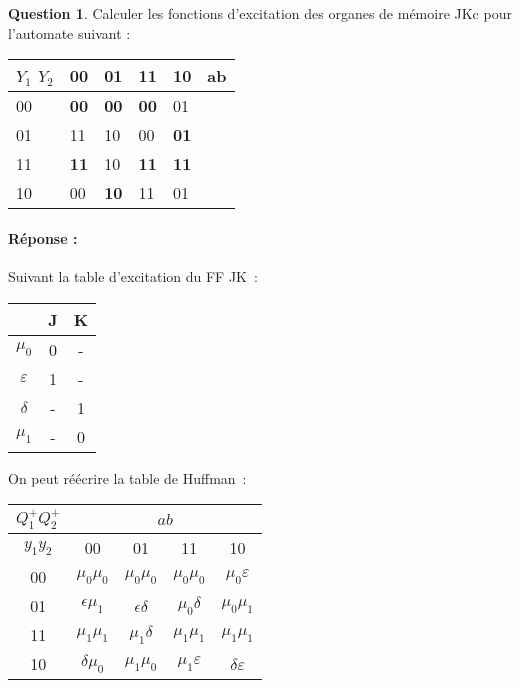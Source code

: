 \documentclass[11pt,a4paper]{article}
\theoremstyle{definition}%
\newtheorem{Q}{Question}[] %
\newcommand{\reponse}[1]{%
	\ifthenelse {\boolean{corrige}} {\paragraph{Réponse :} \color{darkblue}   #1\color{black}} {}
 }
\begin{document}
\begin{Q}
Calculer les fonctions d'excitation des organes de mémoire JKc pour l'automate suivant :


\begin{center}
	\begin{tabular}{|l|l|l|l|l|l}
	\hline
	$Y_1$ $Y_2$ & 00         & 01         & 11         & 10         & \multicolumn{1}{l|}{ab} \\ \hline
	00           & \textbf{00} & \textbf{00} & \textbf{00} & 01          &                         \\ \cline{1-5}
	01           & 11          & 10          & 00          & \textbf{01} &                         \\ \cline{1-5}
	11           & \textbf{11} & 10          & \textbf{11} & \textbf{11} &                         \\ \cline{1-5}
	10           & 00          & \textbf{10} & 11          & 01          &                         \\ \cline{1-5}
	\end{tabular}
\end{center}


\reponse{
	Suivant la table d'excitation du FF JK~:
	\begin{center}
		\begin{tabular}{c|cc}
			& J & K \\ \hline
			$\mu_0$ & 0 & - \\
			$\varepsilon$ & 1 & - \\
			$\delta$ & - & 1 \\
			$\mu_1$ & - & 0
		\end{tabular}
	\end{center}

	On peut réécrire la table de Huffman~:
	\begin{center}
		\begin{tabular}{|c|c|c|c|c|}\hline
		$Q^+_1 Q^+_2$ & \multicolumn{4}{c|}{$ab$} \\ \hline
		$y_1y_2$ & 00 & 01 & 11 & 10 \\ \hline
		00 & $\mu_0\mu_0$ & $\mu_0\mu_0$ & $\mu_0\mu_0$ & $\mu_0\varepsilon$ \\ \hline
		01 & $\epsilon\mu_1$ & $\epsilon\delta$ & $\mu_0\delta$ & $\mu_0\mu_1$ \\ \hline
		11 & $\mu_1\mu_1$ & $\mu_1\delta$ & $\mu_1\mu_1$ & $\mu_1\mu_1$ \\ \hline
		10 & $\delta\mu_0$ & $\mu_1\mu_0$ & $\mu_1\varepsilon$ & $\delta\varepsilon$ \\ \hline
		\end{tabular}
	\end{center}

}
\end{Q}
\end{document}
